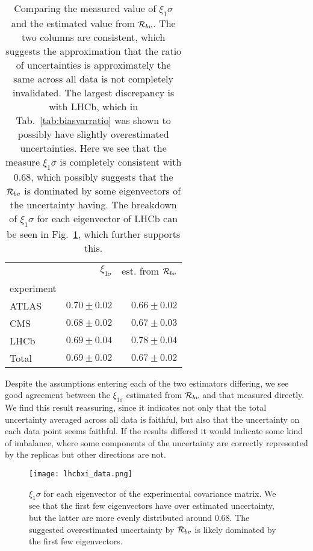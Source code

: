 \begin{table}
    \begin{center}
        \begin{tabular}{lrr}
            \toprule
            {} &  $\xi_{1\sigma}$ &  est. from $\mathcal{R}_{bv}$ \\
            experiment &  &                \\
            \midrule
            ATLAS       &  $0.70 \pm 0.02$ &  $0.66 \pm 0.02$ \\
            CMS         &  $0.68 \pm 0.02$ &  $0.67 \pm 0.03$ \\
            LHCb        &  $0.69 \pm 0.04$ &  $0.78 \pm 0.04$ \\
            Total       &  $0.69 \pm 0.02$ &  $0.67 \pm 0.02$ \\
            \bottomrule
        \end{tabular}
    \end{center}
    \caption{
        Comparing the measured value of $\xi_1\sigma$ and the estimated
        value from $\mathcal{R}_{bv}$. The two columns are consistent, which
        suggests the approximation that the ratio of uncertainties is
        approximately the same across all data is not completely invalidated.
        The largest discrepancy is with LHCb, which in Tab.~\ref{tab:biasvarratio}
        was shown to possibly have slightly overestimated uncertainties. Here we
        see that the measure $\xi_1\sigma$ is completely consistent with 0.68,
        which possibly suggests that the $\mathcal{R}_{bv}$ is dominated by some
        eigenvectors of the uncertainty having. The breakdown of $\xi_1\sigma$
        for each eigenvector of LHCb can be seen in
        Fig.~\ref{fig:xibreakdownlhcb}, which further supports this.
    }
    \label{tab:xicomparison}
\end{table}

Despite the assumptions entering each of the two estimators differing, we see
good agreement between the $\xi_{1\sigma}$ estimated from $\mathcal{R}_{bv}$
and that measured directly. We find this result reassuring, since it indicates
not only that the total uncertainty averaged across all data is faithful, but
also that the uncertainty on each data point seems faithful. If the results
differed it would indicate some kind of imbalance, where some components
of the uncertainty are correctly represented by the replicas but other directions
are not.

\begin{figure}
    \centering
    \texttt{[image: lhcbxi\_data.png]}
    \caption{$\xi_1\sigma$ for each eigenvector of the experimental
    covariance matrix. We see that the first few eigenvectors have over
    estimated uncertainty, but the latter are more evenly distributed
    around 0.68. The suggested overestimated uncertainty by $\mathcal{R}_{bv}$
    is likely dominated by the first few eigenvectors.}
    \label{fig:xibreakdownlhcb}
\end{figure}
